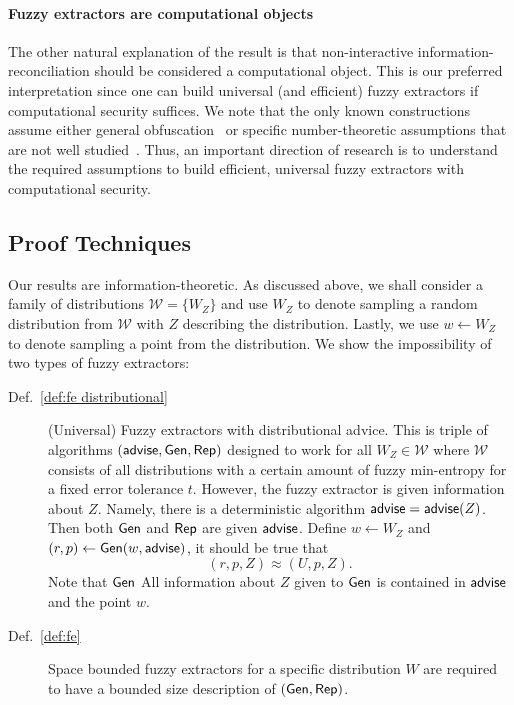 \paragraph{Fuzzy extractors are computational objects} The other natural explanation of the result is that non-interactive information-reconciliation should be considered a computational object. This is our preferred interpretation since one can build universal (and efficient) fuzzy extractors if computational security suffices.  We note that the only known constructions assume either general obfuscation~\cite{BarakBCKPS13,BitanskyCKP14,bitansky2017virtual} or specific number-theoretic assumptions that are not well studied~\cite{galbraith2019obfuscated}. Thus, an important direction of research is to understand the required assumptions to build efficient, universal fuzzy extractors with computational security. 


\subsection{Proof Techniques}
Our results are information-theoretic. As discussed above, we shall
consider a family of distributions $\mathcal{W} = \{ W_Z \}$ and use $W_Z$ to
denote sampling a random distribution from $\mathcal{W}$ with $Z$
describing the distribution.  Lastly, we use $w\leftarrow W_Z$ to
denote sampling a point from the distribution.  We show the
impossibility of two types of fuzzy extractors:
\begin{description}
\item[Def.~\ref{def:fe distributional}] (Universal) Fuzzy extractors with distributional advice.  This is triple of algorithms $({\mathsf{advise}}, {\mathsf{Gen}}, {\mathsf{Rep}})$ designed to work for all $W_Z \in \mathcal{W}$ where $\mathcal{W}$ consists of all distributions with a certain amount of fuzzy min-entropy for a fixed error tolerance $t$.  However, the fuzzy extractor is given information about $Z$.  Namely, there is a deterministic algorithm ${\mathsf{advise}} = {\mathsf{advise}}(Z)$. Then both ${\mathsf{Gen}}$ and ${\mathsf{Rep}}$ are given ${\mathsf{advise}}$. Define $w\leftarrow W_Z$ and $(r, p) \leftarrow {\ensuremath{\mathsf{Gen}}}(w, {\mathsf{advise}})$, it should be true that 
\[
(r, p, Z) \approx (U, p, Z).
\]
Note that ${\mathsf{Gen}}$ All information about $Z$ given to ${\mathsf{Gen}}$ is contained in ${\mathsf{advise}}$ and the point $w$.
\item[Def.~\ref{def:fe}] Space bounded fuzzy extractors for a specific distribution $W$ are required to have a bounded size description of $({\mathsf{Gen}}, {\mathsf{Rep}})$.
\end{description}

